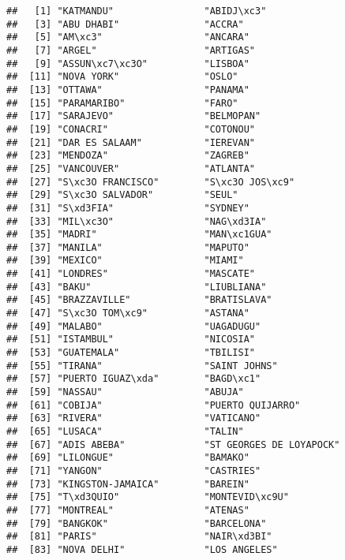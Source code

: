 \documentclass[
]{article}
\begin{document}
\begin{verbatim}
##   [1] "KATMANDU"                "ABIDJ\xc3"              
##   [3] "ABU DHABI"               "ACCRA"                  
##   [5] "AM\xc3"                  "ANCARA"                 
##   [7] "ARGEL"                   "ARTIGAS"                
##   [9] "ASSUN\xc7\xc3O"          "LISBOA"                 
##  [11] "NOVA YORK"               "OSLO"                   
##  [13] "OTTAWA"                  "PANAMA"                 
##  [15] "PARAMARIBO"              "FARO"                   
##  [17] "SARAJEVO"                "BELMOPAN"               
##  [19] "CONACRI"                 "COTONOU"                
##  [21] "DAR ES SALAAM"           "IEREVAN"                
##  [23] "MENDOZA"                 "ZAGREB"                 
##  [25] "VANCOUVER"               "ATLANTA"                
##  [27] "S\xc3O FRANCISCO"        "S\xc3O JOS\xc9"         
##  [29] "S\xc3O SALVADOR"         "SEUL"                   
##  [31] "S\xd3FIA"                "SYDNEY"                 
##  [33] "MIL\xc3O"                "NAG\xd3IA"              
##  [35] "MADRI"                   "MAN\xc1GUA"             
##  [37] "MANILA"                  "MAPUTO"                 
##  [39] "MEXICO"                  "MIAMI"                  
##  [41] "LONDRES"                 "MASCATE"                
##  [43] "BAKU"                    "LIUBLIANA"              
##  [45] "BRAZZAVILLE"             "BRATISLAVA"             
##  [47] "S\xc3O TOM\xc9"          "ASTANA"                 
##  [49] "MALABO"                  "UAGADUGU"               
##  [51] "ISTAMBUL"                "NICOSIA"                
##  [53] "GUATEMALA"               "TBILISI"                
##  [55] "TIRANA"                  "SAINT JOHNS"            
##  [57] "PUERTO IGUAZ\xda"        "BAGD\xc1"               
##  [59] "NASSAU"                  "ABUJA"                  
##  [61] "COBIJA"                  "PUERTO QUIJARRO"        
##  [63] "RIVERA"                  "VATICANO"               
##  [65] "LUSACA"                  "TALIN"                  
##  [67] "ADIS ABEBA"              "ST GEORGES DE LOYAPOCK" 
##  [69] "LILONGUE"                "BAMAKO"                 
##  [71] "YANGON"                  "CASTRIES"               
##  [73] "KINGSTON-JAMAICA"        "BAREIN"                 
##  [75] "T\xd3QUIO"               "MONTEVID\xc9U"          
##  [77] "MONTREAL"                "ATENAS"                 
##  [79] "BANGKOK"                 "BARCELONA"              
##  [81] "PARIS"                   "NAIR\xd3BI"             
##  [83] "NOVA DELHI"              "LOS ANGELES"            

\end{verbatim}
\end{document}
